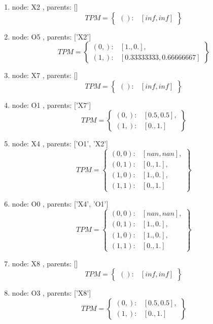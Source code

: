 \documentclass[12pt]{article}
\begin{document}
\begin{enumerate}
\item node: X2
, parents: []
$$TPM = \left\{ \begin{array}{ll}():& [inf, inf]\end{array}\right\}$$

\item node: O5
, parents: ['X2']
$$TPM = \left\{ \begin{array}{ll}(0,):& [1., 0.],\\  (1,):& [0.33333333, 0.66666667]\end{array}\right\}$$

\item node: X7
, parents: []
$$TPM = \left\{ \begin{array}{ll}():& [inf, inf]\end{array}\right\}$$

\item node: O1
, parents: ['X7']
$$TPM = \left\{ \begin{array}{ll}(0,):& [0.5, 0.5],\\  (1,):& [0., 1.]\end{array}\right\}$$

\item node: X4
, parents: ['O1', 'X2']
$$TPM = \left\{ \begin{array}{ll}(0, 0):& [nan, nan],\\ 
 (0, 1):& [0., 1.],\\ 
 (1, 0):& [1., 0.],\\ 
 (1, 1):& [0., 1.]\end{array}\right\}$$

\item node: O0
, parents: ['X4', 'O1']
$$TPM = \left\{ \begin{array}{ll}(0, 0):& [nan, nan],\\ 
 (0, 1):& [1., 0.],\\ 
 (1, 0):& [1., 0.],\\ 
 (1, 1):& [0., 1.]\end{array}\right\}$$

\item node: X8
, parents: []
$$TPM = \left\{ \begin{array}{ll}():& [inf, inf]\end{array}\right\}$$

\item node: O3
, parents: ['X8']
$$TPM = \left\{ \begin{array}{ll}(0,):& [0.5, 0.5],\\  (1,):& [0., 1.]\end{array}\right\}$$


\end{enumerate}
\end{document}

